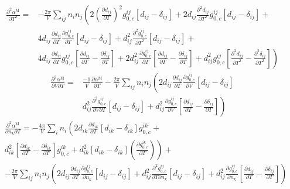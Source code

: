\documentclass[english]{../thermomemo/thermomemo}
\begin{document}
\begin{equation}
\begin{split}
\frac{\partial^2 \alpha^{\text{M}}}{\partial T^2}=&-\frac{2\pi}{V}\sum_{ij}n_in_j\left(2\left(\frac{\partial d_{ij}}{\partial T}\right)^2g_{0,c}^{ij}\left[d_{ij}-\delta_{ij}\right]\right.+2d_{ij}\frac{\partial^2 d_{ij}}{\partial T^2}g_{0,c}^{ij}\left[d_{ij}-\delta_{ij}\right]+\\
&4d_{ij}\frac{\partial d_{ij}}{\partial T}\frac{\partial g_{0,c}^{ij}}{\partial T}\left[d_{ij}-\delta_{ij}\right]+ d_{ij}^2\frac{\partial^2 g_{0,c}^{ij}}{\partial T^2}\left[d_{ij}-\delta_{ij}\right]+ \\
&\left. 4d_{ij}\frac{\partial d_{ij}}{\partial T}g_{0,c}^{ij}\left[\frac{\partial d_{ij}}{\partial T}-\frac{\partial \delta_{ij}}{\partial T}\right]+2d_{ij}^2\frac{\partial g_{0,c}^{ij}}{\partial T}\left[\frac{\partial d_{ij}}{\partial T}-\frac{\partial \delta_{ij}}{\partial T}\right]+d_{ij}^2g_{0,c}^{ij}\left[\frac{\partial^2 d_{ij}}{\partial T^2}-\frac{\partial^2 \delta_{ij}}{\partial T^2}\right]\right)
\end{split}
\end{equation}
\begin{equation}
\begin{split}
\frac{\partial^2 \alpha^{\text{M}}}{\partial V\partial T}=&\frac{-1}{V}\frac{\partial \alpha^{\text{M}}}{\partial T}-\frac{2\pi}{V}\sum_{ij}n_in_j\left(2d_{ij}\frac{\partial d_{ij}}{\partial T}\frac{\partial g_{0,c}^{ij}}{\partial V}\left[d_{ij}-\delta_{ij}\right]\right. \\
&\left.d_{ij}^2\frac{\partial^2 g_{0,c}^{ij}}{\partial V\partial T}\left[d_{ij}-\delta_{ij}\right]+d_{ij}^2\frac{\partial g_{0,c}^{ij}}{\partial V}\left[\frac{\partial d_{ij}}{\partial T}-\frac{\partial\delta_{ij}}{\partial T}\right]\right)
\end{split}
\end{equation}
\begin{equation}
\begin{split}
&\frac{\partial^2 \alpha^{\text{M}}}{\partial n_k\partial T}=-\frac{4\pi}{V}\sum_{i}n_i\left(2d_{ik}\frac{\partial d_{ik}}{\partial T}\left[d_{ik}-\delta_{ik}\right]g_{0,c}^{ik}+\right. \\
&\left.d_{ik}^2\left[\frac{\partial d_{ik}}{\partial T}-\frac{\partial \delta_{ik}}{\partial T}\right]g_{0,c}^{ik}+d_{ik}^2\left[d_{ik}-\delta_{ik}\right]\left(\frac{\partial g_{0,c}^{ik}}{\partial T}\right)\right)+ \\
&-\frac{2\pi}{V}\sum_{ij}n_in_j\left(2d_{ij}\frac{\partial d_{ij}}{\partial T}\frac{\partial g_{0,c}^{ij}}{\partial n_k}\left[d_{ij}-\delta_{ij}\right]+d_{ij}^2\frac{\partial^2 g_{0,c}^{ij}}{\partial T \partial n_k}\left[d_{ij}-\delta_{ij}\right]+d_{ij}^2\frac{\partial g_{0,c}^{ij}}{\partial n_k}\left[\frac{\partial d_{ij}}{\partial T}-\frac{\partial \delta_{ij}}{\partial T}\right]\right)
\end{split}
\end{equation}
\end{document}
